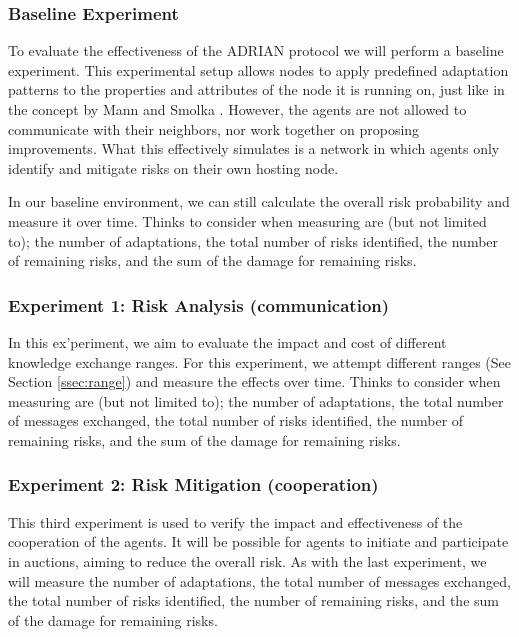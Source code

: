 \subsubsection{Baseline Experiment} 
To evaluate the effectiveness of the ADRIAN protocol we will perform a baseline experiment. This experimental setup allows nodes to apply predefined adaptation patterns to the properties and attributes of the node it is running on, just like in the concept by Mann and Smolka \cite{mann2023ADRIAN}. However, the agents are not allowed to communicate with their neighbors, nor work together on proposing improvements. What this effectively simulates is a network in which agents only identify and mitigate risks on their own hosting node. 

In our baseline environment, we can still calculate the overall risk probability and measure it over time. Thinks to consider when measuring are (but not limited to); the number of adaptations, the total number of risks identified, the number of remaining risks, and the sum of the damage for remaining risks.

\subsubsection{Experiment 1: Risk Analysis (communication)} 
In this ex'periment, we aim to evaluate the impact and cost of different knowledge exchange ranges. For this experiment, we attempt different ranges (See Section \ref{ssec:range}) and measure the effects over time. Thinks to consider when measuring are (but not limited to); the number of adaptations, the total number of messages exchanged, the total number of risks identified, the number of remaining risks, and the sum of the damage for remaining risks.

\subsubsection{Experiment 2: Risk Mitigation (cooperation)}
This third experiment is used to verify the impact and effectiveness of the cooperation of the agents. It will be possible for agents to initiate and participate in auctions, aiming to reduce the overall risk. As with the last experiment, we will measure the number of adaptations, the total number of messages exchanged, the total number of risks identified, the number of remaining risks, and the sum of the damage for remaining risks.


